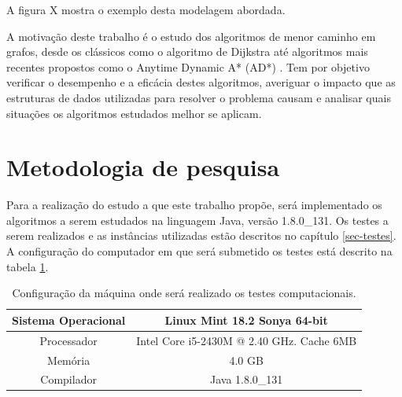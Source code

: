 A figura X mostra o exemplo desta modelagem abordada.

A motivação deste trabalho é o estudo dos algoritmos de menor caminho em grafos, desde os clássicos como o algoritmo de Dijkstra \cite{dijkstra1959note} até algoritmos mais recentes propostos como o Anytime Dynamic A* (AD*) \cite{likhachev2008anytime}. Tem por  objetivo verificar o desempenho e a eficácia destes algoritmos, averiguar o impacto que as estruturas de dados utilizadas para resolver o problema causam e analisar quais situações os algoritmos estudados melhor se aplicam.

\section{Metodologia de pesquisa}
\label{sec-intro-metodologia}
Para a realização do estudo a que este trabalho propõe, será implementado os algoritmos a serem estudados na linguagem Java, versão 1.8.0\_131. Os testes a serem realizados e as instâncias utilizadas estão descritos no capítulo \ref{sec-testes}. A configuração do computador em que será submetido os testes está descrito na tabela \ref{tbl-intro-configuracaomaquina}.

\begin{table}[H]
\centering
\caption{Configuração da máquina onde será realizado os testes computacionais.}
\label{tbl-intro-configuracaomaquina}
\begin{adjustbox}{max width=\textwidth}
\begin{tabular}{|c|c|}
\hline
Sistema Operacional & Linux Mint  18.2  Sonya 64-bit            \\ \hline
Processador         & Intel Core i5-2430M @ 2.40 GHz. Cache 6MB \\ \hline
Memória             & 4.0 GB                                    \\ \hline
Compilador          & Java 1.8.0\_131                           \\ \hline
\end{tabular}
\end{adjustbox}
\end{table}

